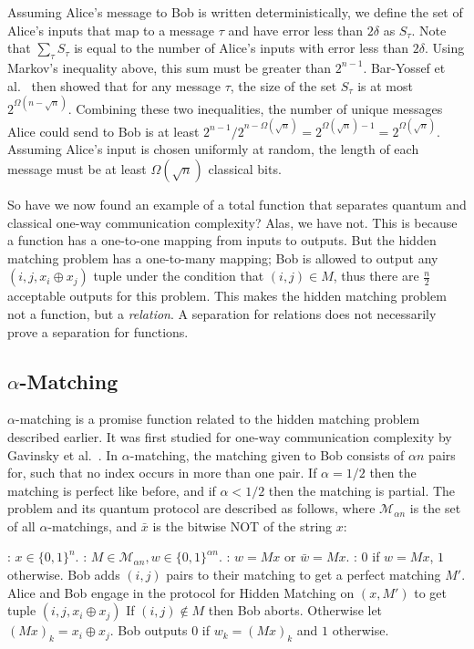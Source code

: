 \documentclass[a4paper]{article}
\begin{document}
        Assuming Alice's message to Bob is written deterministically, we define the set of Alice's inputs that map to a message $\tau$ and have error less than $2\delta$ as $S_{\tau}$. Note that $\sum_{\tau}S_{\tau}$ is equal to the number of Alice's inputs with error less than $2\delta$. Using Markov's inequality above, this sum must be greater than $2^{n-1}$. Bar-Yossef et al.~ then showed that for any message $\tau$, the size of the set $S_{\tau}$ is at most $2^{\Omega(n - \sqrt{n})}$. Combining these two inequalities, the number of unique messages Alice could send to Bob is at least $2^{n - 1}/2^{n - \Omega(\sqrt{n})} = 2^{\Omega(\sqrt{n}) - 1} = 2^{\Omega(\sqrt{n})}$. Assuming Alice's input is chosen uniformly at random, the length of each message must be at least $\Omega(\sqrt{n})$ classical bits.

        So have we now found an example of a total function that separates quantum and classical one-way communication complexity? Alas, we have not. This is because a function has a one-to-one mapping from inputs to outputs. But the hidden matching problem has a one-to-many mapping; Bob is allowed to output any $(i, j, x_i \oplus x_j)$ tuple under the condition that $(i, j) \in M$, thus there are $\frac{n}{2}$ acceptable outputs for this problem. This makes the hidden matching problem not a function, but a {\em relation}. A separation for relations does not necessarily prove a separation for functions.

        \subsection{$\alpha$-Matching}

        $\alpha$-matching is a promise function related to the hidden matching problem described earlier. It was first studied for one-way communication complexity by Gavinsky et al.~\cite{Gavinsky:2007:ESO:1250790.1250866}. In $\alpha$-matching, the matching given to Bob consists of $\alpha n$ pairs for, such that no index occurs in more than one pair. If $\alpha = 1/2$ then the matching is perfect like before, and if $\alpha < 1/2$ then the matching is partial. The problem and its quantum protocol are described as follows, where $\mathcal{M}_{\alpha n}$ is the set of all $\alpha$-matchings, and $\bar{x}$ is the bitwise NOT of the string $x$:

        \begin{codebox}
            \zi {}: $x \in \{0,1\}^n$.
            \zi {}: $M \in \mathcal{M}_{\alpha n}, w \in \{0, 1\}^{\alpha n}$.
            \zi {}: $w = Mx$ or $\bar{w} = Mx$.
            \zi {}: $0$ if $w = Mx$, $1$ otherwise.
            \li Bob adds $(i, j)$ pairs to their matching to get a perfect matching $M'$.
            \li Alice and Bob engage in the protocol for Hidden Matching on $(x, M')$ to get tuple $(i, j, x_i \oplus x_j)$
            \li If $(i, j) \notin M$ then Bob aborts. Otherwise let $(Mx)_k = x_i \oplus x_j$.
            \li Bob outputs $0$ if $w_k = (Mx)_k$ and $1$ otherwise.
        \end{codebox}
\end{document}
